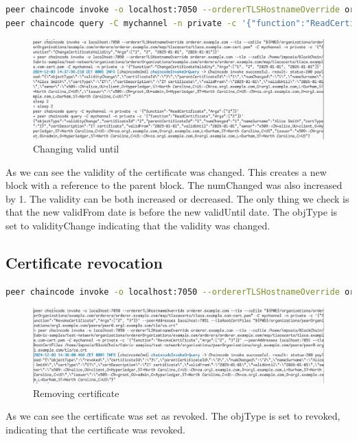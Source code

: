 \documentclass[12pt]{article}
\begin{document}
\begin{lstlisting}[language=bash]
peer chaincode invoke -o localhost:7050 --ordererTLSHostnameOverride orderer.example.com --tls --cafile "${PWD}/organizations/ordererOrganizations/example.com/orderers/orderer.example.com/msp/tlscacerts/tlsca.example.com-cert.pem" -C mychannel -n private -c '{"function":"ChangeCertificateValidity","Args":["1", "2", "2025-01-01", "2026-01-01"]}'
peer chaincode query -C mychannel -n private -c '{"function":"ReadCertificate","Args":["2"]}'
\end{lstlisting}

\begin{figure}[H]
    \centering
    \includegraphics[width=\textwidth]{imgs/changing_validity.PNG}
    \caption{Changing valid until}
    \label{fig:changingvaliduntil}
\end{figure}

As we can see the validity of the certificate was changed.
This creates a new block with a reference to the parent block.
The numChanged was also increased by 1.
The validity can be both increased or decreased.
The only thing we check is that the new validFrom date is before the new validUntil date.
The objType is set to validityChange indicating that the validity was changed.

\subsection{Certificate revocation}

\begin{lstlisting}[language=bash]
peer chaincode invoke -o localhost:7050 --ordererTLSHostnameOverride orderer.example.com --tls --cafile "${PWD}/organizations/ordererOrganizations/example.com/orderers/orderer.example.com/msp/tlscacerts/tlsca.example.com-cert.pem" -C mychannel -n private -c '{"function":"RemoveCertificate","Args":["certificate1"]}' --peerAddresses localhost:7051 --tlsRootCertFiles "${PWD}/organizations/peerOrganizations/org1.example.com/peers/peer0.org1.example.com/tls/ca.crt"
\end{lstlisting}

\begin{figure}[H]
    \includegraphics[width=\textwidth]{imgs/revoking_certificate.PNG}
    \caption{Removing certificate}
    \label{fig:removingcertificate}
\end{figure}

As we can see the certificate was set as revoked.
The objType is set to revoked, indicating that the certificate was revoked.
\end{document}
